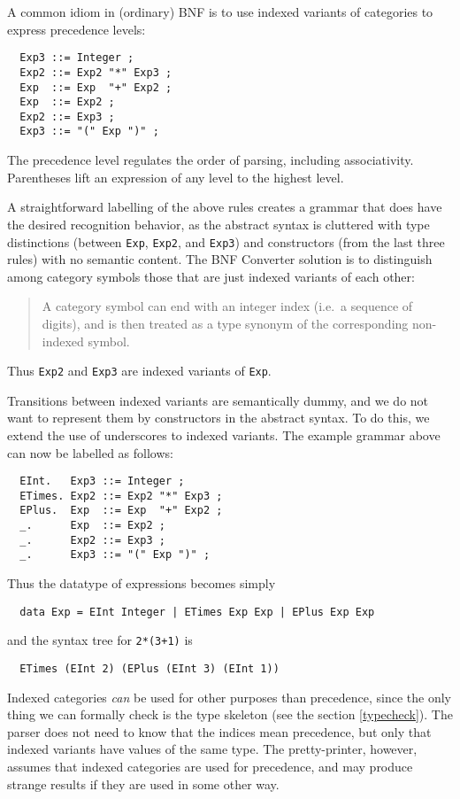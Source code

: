 \documentclass[10pt]{article}
\newcommand{\bequ}{\begin{quote}}
\newcommand{\enqu}{\end{quote}}
\begin{document}
A common idiom in (ordinary) BNF is to use indexed variants of categories
to express precedence levels:
\begin{verbatim}
  Exp3 ::= Integer ;
  Exp2 ::= Exp2 "*" Exp3 ;
  Exp  ::= Exp  "+" Exp2 ;
  Exp  ::= Exp2 ;
  Exp2 ::= Exp3 ;
  Exp3 ::= "(" Exp ")" ;
\end{verbatim}
The precedence level regulates the order of parsing, including
associativity. Parentheses lift an expression of any level
to the highest level.

A straightforward labelling of the above rules creates a grammar that does
have the desired recognition behavior, as the abstract syntax is cluttered
with type distinctions (between {\tt Exp}, {\tt Exp2}, and {\tt Exp3})
and constructors (from the last three rules) with no semantic content.
The BNF Converter solution is to distinguish among
category symbols those that are just indexed variants of each other:
\bequ
A category symbol can end with an integer index 
(i.e.\ a sequence of digits), and is then treated as a type 
synonym of the corresponding non-indexed symbol.
\enqu
Thus {\tt Exp2} and {\tt Exp3} are indexed variants of {\tt Exp}.

Transitions between indexed variants are
semantically dummy, and we do not want to represent them by
constructors in the abstract syntax. To do this, we extend the use
of underscores to indexed variants.
The example grammar above can now be labelled as follows:
\begin{verbatim}
  EInt.   Exp3 ::= Integer ;
  ETimes. Exp2 ::= Exp2 "*" Exp3 ;
  EPlus.  Exp  ::= Exp  "+" Exp2 ;
  _.      Exp  ::= Exp2 ;
  _.      Exp2 ::= Exp3 ;
  _.      Exp3 ::= "(" Exp ")" ;
\end{verbatim}
Thus the datatype of expressions becomes simply
\begin{verbatim}
  data Exp = EInt Integer | ETimes Exp Exp | EPlus Exp Exp
\end{verbatim}
and the syntax tree for {\tt 2*(3+1)} is
\begin{verbatim}
  ETimes (EInt 2) (EPlus (EInt 3) (EInt 1))
\end{verbatim}

Indexed categories {\em can} be used for other purposes than 
precedence, since the only thing we can formally check is the
type skeleton (see the section \ref{typecheck}). 
The parser does not need to know
that the indices mean precedence, but only that indexed 
variants have values of the same type.
The pretty-printer, however, assumes that
indexed categories are used for precedence, and may produce
strange results if they are used in some other way.
\end{document}
